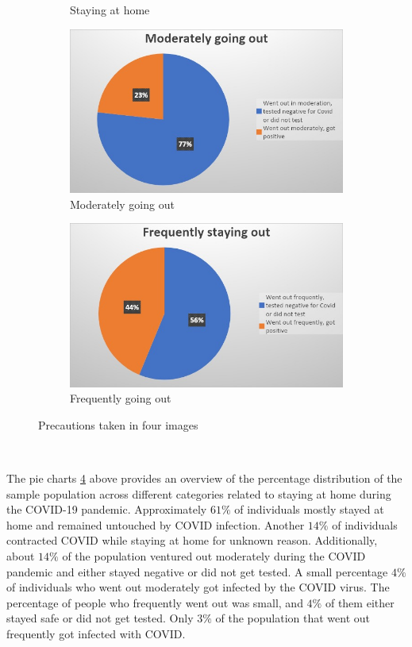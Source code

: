\begin{figure}[h!]
\begin{subfigure}{0.45\linewidth}
        \caption{Staying at home}
        \label{G30}
    \end{subfigure}
    
    \begin{subfigure}{0.45\linewidth}
        \includegraphics[width=\linewidth]{IMAGES/Image 31.jpeg}
        \caption{Moderately going out}
        \label{G31}
    \end{subfigure}
    \hfill
    \begin{subfigure}{0.45\linewidth}
        \includegraphics[width=\linewidth]{IMAGES/Image 32.jpeg}
        \caption{Frequently going out}
        \label{G32}
    \end{subfigure}

    \caption{Precautions taken in four images}
    \label{all_images}
\end{figure}


\ 

The pie charts \ref{all_images} above provides an overview of the percentage distribution of the sample population across different categories related to staying at home during the COVID-19 pandemic. Approximately $61\%$ of individuals mostly stayed at home and remained untouched by COVID infection. Another $14\%$ of individuals contracted COVID while staying at home for unknown reason. Additionally, about $14\%$ of the population ventured out moderately during the COVID pandemic and either stayed negative or did not get tested. A small percentage $4\%$ of individuals who went out moderately got infected by the COVID virus. The percentage of people who frequently went out was small, and $4\%$ of them either stayed safe or did not get tested. Only $3\%$ of the population that went out frequently got infected with COVID.

